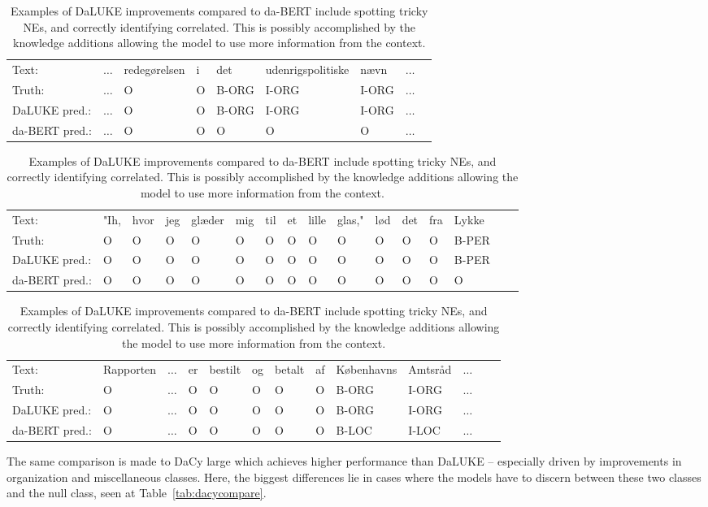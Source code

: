 \documentclass[main.tex]{subfiles}
\begin{document}
\begin{table}[H]
    \footnotesize
    \begin{tabular}{l|llllllll}
        Text:             & $\ldots$  & redegørelsen  & i  & det    & udenrigspolitiske  & nævn   & $\ldots$ \\
        Truth:            & $\ldots$  & O             & O  & B-ORG  & I-ORG              & I-ORG  & $\ldots$ \\\hline
        DaLUKE pred.:     & $\ldots$  & O             & O  & B-ORG  & I-ORG              & I-ORG  & $\ldots$ \\
        da-BERT pred.:    & $\ldots$  & O             & O  & O      & O                  & O      & $\ldots$ \\
    \end{tabular}\par
    \begin{tabular}{l|lllllllllllllll}
        Text:            &  "Ih,   & hvor  & jeg  & glæder  & mig  & til  & et  & lille  & glas,"  & lød  & det  & fra  & Lykke  \\
        Truth:           &  O    & O     & O    & O       & O    & O    & O   & O      & O        & O    & O    & O    & B-PER  \\\hline
        DaLUKE pred.:    &  O    & O     & O    & O       & O    & O    & O   & O      & O        & O    & O    & O    & B-PER  \\
        da-BERT pred.:   &  O    & O     & O    & O       & O    & O    & O   & O      & O        & O    & O    & O    & O
    \end{tabular}\par
    \begin{tabular}{l|llllllllllll}
        Text:            & Rapporten  & $\ldots$  & er  & bestilt  & og  & betalt  & af  & Københavns  & Amtsråd  & $\ldots$\\
        Truth:           & O          & $\ldots$  & O   & O        & O   & O       & O   & B-ORG       & I-ORG    & $\ldots$\\\hline
        DaLUKE  pred.:   & O          & $\ldots$  & O   & O        & O   & O       & O   & B-ORG       & I-ORG    & $\ldots$\\
        da-BERT pred.:   & O          & $\ldots$  & O   & O        & O   & O       & O   & B-LOC       & I-LOC    & $\ldots$
    \end{tabular}
    \caption{
        Examples of DaLUKE improvements compared to da-BERT include spotting tricky NEs, and correctly identifying correlated.
        This is possibly accomplished by the knowledge additions allowing the model to use more information from the context.
    }
    \label{tab:daberterrors}
\end{table}\noindent
The same comparison is made to DaCy large which achieves higher performance than DaLUKE -- especially driven by improvements in organization and miscellaneous classes.
Here, the biggest differences lie in cases where the models have to discern between these two classes and the null class, seen at Table~\ref{tab:dacycompare}.
\end{document}
